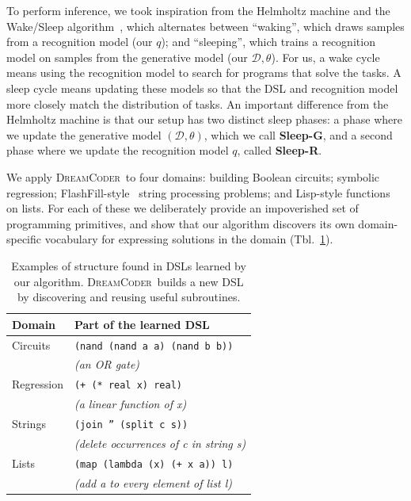 \documentclass{article}
\newcommand{\system}{\textsc{DreamCoder}~}
\newcommand{\code}[1]{{\footnotesize\texttt{#1}}}
\begin{document}
To perform inference, we took inspiration from the Helmholtz machine and the Wake/Sleep algorithm~\cite{hinton1995wake},
which alternates between ``waking'', which draws samples from a recognition model (our $q$);
and  ``sleeping'', which trains a recognition model on samples from the generative model (our $\mathcal{D},\theta$).
For us, a wake cycle means using the recognition model to search for programs that solve the tasks.
A sleep cycle means  updating these models so that the DSL and  recognition model
more closely match the distribution of tasks.
An important difference from the Helmholtz machine
is that our setup has two distinct sleep phases: a phase where we update the generative model
$(\mathcal{D},\theta)$, which we call \textbf{Sleep-G},
and a second phase where we update the recognition model $q$,
 called \textbf{Sleep-R}.



We apply \system to four domains:
 building Boolean circuits; symbolic regression; FlashFill-style~\cite{gulwani2011automating} string processing problems; and Lisp-style functions on lists.
 For each of these we deliberately provide an impoverished
 set of programming primitives,
 and show that our algorithm discovers
 its own domain-specific vocabulary for expressing solutions in the domain (Tbl.~\ref{initialExampleDSL}).
 \begin{table}
    \begin{tabular}{ll}
   \toprule
   Domain&Part of the learned DSL\\\midrule
   Circuits&\code{(nand (nand a a) (nand b b))}\\
   &\hspace{0.5cm} \emph{(an OR gate)}\\
   Regression& \code{(+ (* real x) real)} \\
      &\hspace{0.5cm} \emph{(a linear function of x)}\\
   Strings& \code{(join '' (split c s))}\\
   &\hspace{0.5cm} \emph{(delete occurrences of c in string s)}\\
   Lists& \code{(map (lambda (x) (+ x a)) l)}\\
   &\hspace{0.5cm} \emph{(add a to every element of list l)}
   \\\bottomrule
    \end{tabular}
    \caption{ Examples of structure found in DSLs  learned by our algorithm. \system builds a new DSL by discovering and reusing useful subroutines.}\label{initialExampleDSL}
 \end{table}
\end{document}

